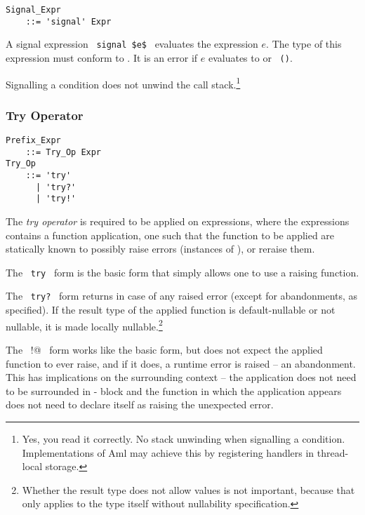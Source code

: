 \grammar\begin{lstlisting}
Signal_Expr 
    ::= 'signal' Expr
\end{lstlisting}

A signal expression ~\lstinline!signal $e$!~ evaluates the expression $e$. The type of this expression must conform to . It is an error if $e$ evaluates to  or ~\lstinline!()!.

Signalling a condition does not unwind the call stack.\footnote{Yes, you read it correctly. No stack unwinding when signalling a condition. Implementations of Aml may achieve this by registering handlers in thread-local storage.}





\subsubsection{Try Operator}
\label{sec:try-operator}

\grammar\begin{lstlisting}
Prefix_Expr 
    ::= Try_Op Expr
Try_Op 
    ::= 'try' 
      | 'try?' 
      | 'try!'
\end{lstlisting}

The {\em try operator} is required to be applied on expressions, where the expressions contains a function application, one such that the function to be applied are statically known to possibly raise errors (instances of ), or reraise them. 

The ~\lstinline!try!~ form is the basic form that simply allows one to use a raising function. 

The ~\lstinline!try?!~ form returns  in case of any raised error (except for abandonments, as specified). If the result type of the applied function is default-nullable or not nullable, it is made locally nullable.\footnote{Whether the result type does not allow  values is not important, because that only applies to the type itself without nullability specification.}

The ~\lstinline@try!@~ form works like the basic form, but does not expect the applied function to ever raise, and if it does, a runtime error is raised -- an abandonment. This has implications on the surrounding context -- the application does not need to be surrounded in - block and the function in which the application appears does not need to declare itself as raising the unexpected error. 

